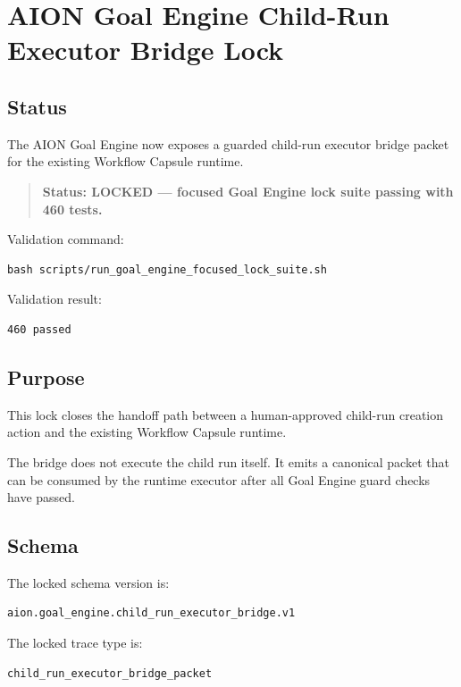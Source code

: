 \section{AION Goal Engine Child-Run Executor Bridge Lock}
\label{sec:aion-goal-engine-child-run-executor-bridge-lock}

\subsection{Status}

The AION Goal Engine now exposes a guarded child-run executor bridge packet for the existing Workflow Capsule runtime.

\begin{quote}
\textbf{Status: LOCKED --- focused Goal Engine lock suite passing with 460 tests.}
\end{quote}

Validation command:

\begin{verbatim}
bash scripts/run_goal_engine_focused_lock_suite.sh
\end{verbatim}

Validation result:

\begin{verbatim}
460 passed
\end{verbatim}

\subsection{Purpose}

This lock closes the handoff path between a human-approved child-run creation action and the existing Workflow Capsule runtime.

The bridge does not execute the child run itself. It emits a canonical packet that can be consumed by the runtime executor after all Goal Engine guard checks have passed.

\subsection{Schema}

The locked schema version is:

\begin{verbatim}
aion.goal_engine.child_run_executor_bridge.v1
\end{verbatim}

The locked trace type is:

\begin{verbatim}
child_run_executor_bridge_packet
\end{verbatim}

